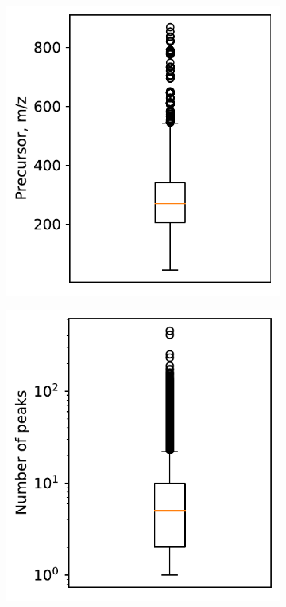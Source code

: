 \begin{figure}[H]
\centering
	 \begin{subfigure}[a]{0.35\textwidth}
 		 \includegraphics[width=1\textwidth]{include/img/results/Precursors.pdf}
 		 \caption{}
 	\end{subfigure}
 		 \begin{subfigure}[a]{0.35\textwidth}
  		\includegraphics[width=1\textwidth]{include/img/results/NumberPeaks.pdf}

\end{subfigure}
\end{figure}
